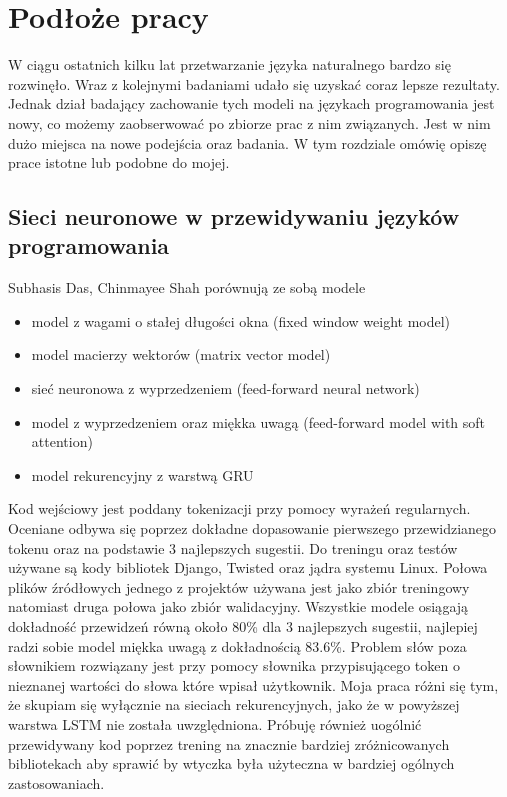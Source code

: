 \newpage %
\section{Podłoże pracy}
W ciągu ostatnich kilku lat przetwarzanie języka naturalnego bardzo się rozwinęło. Wraz z kolejnymi 
badaniami udało się uzyskać coraz lepsze rezultaty. Jednak dział badający zachowanie tych modeli 
na językach programowania jest nowy, co możemy zaobserwować po zbiorze prac \cite{ml4code}
z nim związanych. Jest w nim dużo miejsca na nowe podejścia oraz badania. W tym rozdziale omówię 
opiszę prace istotne lub podobne do mojej.  


\subsection{Sieci neuronowe w przewidywaniu języków programowania}
Subhasis Das, Chinmayee Shah \cite{contextual_code_completion} porównują ze sobą modele
\begin{itemize}
    \item model z wagami o stałej długości okna (fixed window weight model)
    \item model macierzy wektorów (matrix vector model)
    \item sieć neuronowa z wyprzedzeniem (feed-forward neural network)
    \item model z wyprzedzeniem oraz miękka uwagą (feed-forward model with soft attention)
    \item model rekurencyjny z warstwą GRU
\end{itemize}
Kod wejściowy jest poddany tokenizacji przy pomocy wyrażeń regularnych. Oceniane odbywa się poprzez dokładne
dopasowanie pierwszego przewidzianego tokenu oraz na podstawie 3 najlepszych sugestii. Do treningu oraz testów 
używane są kody bibliotek Django, Twisted oraz jądra systemu Linux. Połowa plików źródłowych jednego z 
projektów używana jest jako zbiór treningowy natomiast druga połowa jako zbiór walidacyjny. Wszystkie modele
osiągają dokładność przewidzeń równą około 80\% dla 3 najlepszych sugestii, najlepiej radzi sobie model miękka uwagą
z dokładnością 83.6\%. Problem słów poza słownikiem rozwiązany jest przy pomocy słownika przypisującego 
token o nieznanej wartości do słowa które wpisał użytkownik. Moja praca różni się tym, że skupiam się 
wyłącznie na sieciach rekurencyjnych, jako że w powyższej warstwa LSTM nie została uwzględniona. Próbuję 
również uogólnić przewidywany kod poprzez trening na znacznie bardziej zróżnicowanych bibliotekach aby sprawić
by wtyczka była użyteczna w bardziej ogólnych zastosowaniach. \\

